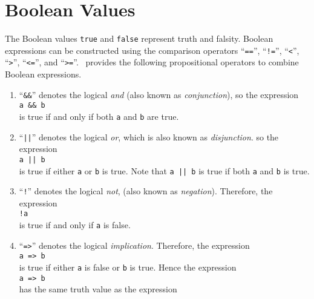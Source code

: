 \section{Boolean Values}
The Boolean values \texttt{true} and \texttt{false} represent truth and falsity.  Boolean
expressions can be constructed using the comparison operators ``\texttt{==}'', 
``\texttt{!=}'', ``\texttt{<}'',  ``\texttt{>}'', ``\texttt{<=}'', and ``\texttt{>=}''.
 \setlx\
provides the following propositional operators to combine Boolean expressions.
\begin{enumerate}
\item ``\texttt{\&\&}'' denotes the logical \emph{and} (also known as \emph{conjunction}), so the expression
      \\[0.2cm]
      \hspace*{1.3cm}
      \texttt{a \&\& b}
      \\[0.2cm]
      is true if and only if both \texttt{a} and \texttt{b} are true.
\item ``\texttt{||}'' denotes the logical \emph{or}, which is also known as \emph{disjunction}.
      so the expression
      \\[0.2cm]
      \hspace*{1.3cm}
      \texttt{a || b}
      \\[0.2cm]
      is true if either \texttt{a} or \texttt{b} is true.  Note that 
      \texttt{a || b} is true if both \texttt{a} and \texttt{b} is
      true.
\item ``\texttt{!}'' denotes the logical \emph{not}, (also known as \emph{negation}).
      Therefore, the expression
      \\[0.2cm]
      \hspace*{1.3cm}
      \texttt{!a}
      \\[0.2cm]
      is true if and only if \texttt{a} is false.  
\item ``\texttt{=>}'' denotes the logical \emph{implication}.
      Therefore, the expression
      \\[0.2cm]
      \hspace*{1.3cm}
      \texttt{a => b}
      \\[0.2cm]
      is true if either \texttt{a} is false or \texttt{b} is true. Hence the expression 
      \\[0.2cm]
      \hspace*{1.3cm}
      \texttt{a => b}
      \\[0.2cm]
      has the same truth value as the expression
      \\[0.2cm]

\end{enumerate}
